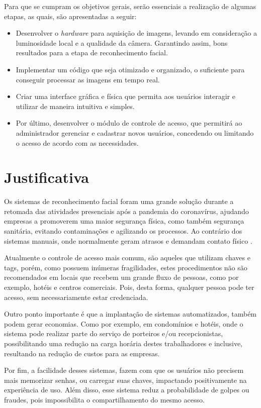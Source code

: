 Para que se cumpram os objetivos gerais, serão essenciais a realização de algumas etapas, 
as quais, são apresentadas a seguir:

\begin{itemize}
    \item  Desenvolver o \textit{hardware} para aquisição de imagens, levando em 
    consideração a luminosidade local e a qualidade da câmera. Garantindo assim, 
    bons resultados para a etapa de reconhecimento facial.
  
    \item Implementar um código que seja otimizado e organizado, o suficiente para 
    conseguir processar as imagens em tempo real. 
    
    \item Criar uma interface gráfica e física que permita aos usuários interagir 
    e utilizar de maneira intuitiva e simples.
    
    \item Por último, desenvolver o módulo de controle de acesso, que permitirá 
    ao administrador gerenciar e cadastrar novos usuários, concedendo ou 
    limitando o acesso de acordo com as necessidades.
\end{itemize}

\section{Justificativa}\label{sec:justificativa}

Os sistemas de reconhecimento facial foram uma grande solução durante a retomada 
das atividades presenciais após a pandemia do coronavírus, ajudando empresas
a promoverem uma maior segurança física, como também segurança sanitária, 
evitando contaminações e agilizando os processos. Ao contrário dos sistemas 
manuais, onde normalmente geram atrasos e demandam contato físico \cite{terra2020}.

Atualmente o controle de acesso mais comum, são aqueles que utilizam chaves 
e tags, porém, como possuem inúmeras fragilidades, estes procedimentos não são 
recomendados em locais que recebem um grande fluxo de pessoas, como por exemplo, 
hotéis e centros comerciais. Pois, desta forma, qualquer pessoa pode ter acesso, 
sem necessariamente estar credenciada.

Outro ponto importante é que a implantação de sistemas automatizados, também 
podem gerar economias. Como por exemplo, em condomínios e hotéis, onde o 
sistema pode realizar parte do serviço de porteiros e/ou recepcionistas, 
possibilitando uma redução na carga horária destes trabalhadores e 
inclusive, resultando na redução de custos para as empresas.

Por fim, a facilidade desses sistemas, fazem com que os usuários não precisem 
mais memorizar senhas, ou carregar suas chaves, impactando positivamente na 
experiência de uso. Além disso, esse sistema reduz a probabilidade de golpes 
ou fraudes, pois impossibilita o compartilhamento do mesmo acesso.
